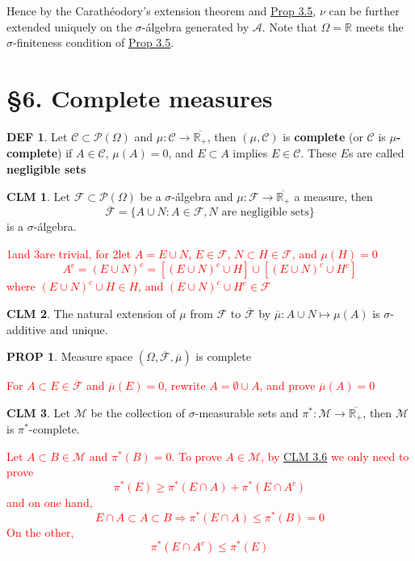\documentclass[hidelinks]{article}
\theoremstyle{definition}
\newtheorem*{defin}{DEF}
\theoremstyle{dotless}
\newtheorem{proposition}{PROP}[section]
\newtheorem{claim}{CLM}[section]
\theoremstyle{remark}
\begin{document}
\bigbreak
Hence by the Carathéodory's extension theorem and \hyperref[Prop 3.5]{Prop 3.5}, $\nu$ can be further extended uniquely on the $\sigma$-álgebra generated by $\mathscr{A}$. Note that $\Omega=\mathbb{R}$ meets the $\sigma$-finiteness condition of \hyperref[Prop 3.5]{Prop 3.5}.

\bigbreak

\section*{\S6. Complete measures}
\setcounter{section}{6}

\begin{defin}
Let $\mathscr{C}\subset\mathscr{P}(\Omega)$ and $\mu:\mathscr{C}\to\overline{\mathbb{R}_+}$, then $(\mu,\mathscr{C})$ is \textbf{complete} (or $\mathscr{C}$ is \textbf{$\mu$-complete}) if $A\in\mathscr{C}$, $\mu(A)=0$, and $E\subset A$ implies $E\in\mathscr{C}$. These $E$s are called \textbf{negligible sets}
\end{defin}

\begin{claim}
Let $\mathscr{F}\subset\mathscr{P}(\Omega)$ be a $\sigma$-álgebra and $\mu:\mathscr{F}\to\overline{\mathbb{R}_+}$ a measure, then
\[\overline{\mathscr{F}}=\{A\cup N:A\in\mathscr{F},N\textrm{ are negligible sets}\}\]
is a $\sigma$-álgebra.
\end{claim}
\textcolor{red}{1\degree and 3\degree are trivial, for 2\degree let $A=E\cup N$, $E\in\mathscr{F}$, $N\subset H\in\mathscr{F}$, and $\mu(H)=0$
\[A^c=(E\cup N)^c=[(E\cup N)^c\cup H]\cup[(E\cup N)^c\cup H^c]\]
where $(E\cup N)^c\cup H\in H$, and $(E\cup N)^c\cup H^c\in\mathscr{F}$}

\begin{claim}
The natural extension of $\mu$ from $\mathscr{F}$ to $\overline{\mathscr{F}}$ by $\overline{\mu}:A\cup N\mapsto\mu(A)$ is $\sigma$-additive and unique.
\end{claim}

\begin{proposition}
Measure space $(\Omega,\overline{\mathscr{F}},\overline{\mu})$ is complete
\end{proposition}
\textcolor{red}{For $A\subset E\in\overline{\mathscr{F}}$ and $\overline{\mu}(E)=0$, rewrite $A=\emptyset\cup A$, and prove $\overline{\mu}(A)=0$}

\begin{claim}
Let $\mathscr{M}$ be the collection of $\sigma$-measurable sets and $\pi^*:\mathscr{M}\to\overline{\mathbb{R}_+}$, then $\mathscr{M}$ is $\pi^*$-complete.
\end{claim}
\textcolor{red}{Let $A\subset B\in\mathscr{M}$ and $\pi^*(B)=0$. To prove $A\in\mathscr{M}$, by \hyperref[CLM 3.6]{CLM 3.6} we only need to prove \[\pi^*(E)\geq\pi^*(E\cap A)+\pi^*(E\cap A^c)\]
and on one hand,
\[E\cap A\subset A\subset B\Rightarrow\pi^*(E\cap A)\leq\pi^*(B)=0\]
On the other,
\[\pi^*(E\cap A^c)\leq\pi^*(E)\]}
\end{document}
